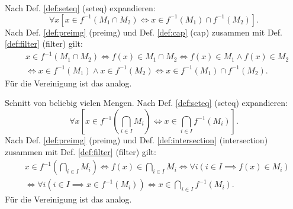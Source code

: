 \begin{Beweis}
Nach Def. \ref{def:seteq} (seteq) expandieren:
\[\forall x[x\in f^{-1}(M_1\cap M_2)\iff x\in f^{-1}(M_1)\cap f^{-1}(M_2)].\]
Nach Def. \ref{def:preimg} (preimg) und Def. \ref{def:cap} (cap)
zusammen mit Def. \ref{def:filter} (filter) gilt:
\begin{align*}
& x\in f^{-1}(M_1\cap M_2) \iff f(x)\in M_1\cap M_2
\iff f(x)\in M_1\land f(x)\in M_2\\
&\iff x\in f^{-1}(M_1)\land x\in f^{-1}(M_2)
\iff x\in f^{-1}(M_1)\cap f^{-1}(M_2).
\end{align*}
Für die Vereinigung ist das analog.

Schnitt von beliebig vielen Mengen.
Nach Def. \ref{def:seteq} (seteq) expandieren:
\[\forall x[x\in f^{-1}(\bigcap_{i\in I}M_i)
\iff x\in \bigcap_{i\in I} f^{-1}(M_i)].\]
Nach Def. \ref{def:preimg} (preimg) und Def. \ref{def:intersection}
(intersection) zusammen mit Def. \ref{def:filter} (filter) gilt:
\begin{align*}
& x\in f^{-1}(\bigcap_{i\in I} M_i)\iff f(x)\in\bigcap_{i\in I} M_i
\iff \forall i(i\in I\implies f(x)\in M_i)\\
&\iff \forall i(i\in I\implies x\in f^{-1}(M_i))
\iff x\in \bigcap_{i\in I} f^{-1}(M_i).
\end{align*}
Für die Vereinigung ist das analog.\;\qedsymbol
\end{Beweis}

